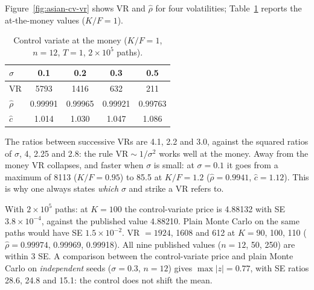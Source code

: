 Figure~\ref{fig:asian-cv-vr} shows VR and $\hat\rho$ for four volatilities; Table~\ref{tab:asian-vr} reports the
at-the-money values ($K/F=1$).
\begin{table}[htbp]
\centering
\small
\caption{Control variate at the money ($K/F=1$, $n=12$, $T=1$, $2\times10^5$ paths).}
\label{tab:asian-vr}
\begin{tabular}{lcccc}
\toprule
$\sigma$ & 0.1 & 0.2 & 0.3 & 0.5\\
\midrule
VR & 5793 & 1416 & 632 & 211\\
$\hat\rho$ & 0.99991 & 0.99965 & 0.99921 & 0.99763\\
$\hat c$ & 1.014 & 1.030 & 1.047 & 1.086\\
\bottomrule
\end{tabular}
\end{table}

The ratios between successive VRs are 4.1, 2.2 and 3.0, against the squared ratios of $\sigma$, 4, 2.25 and 2.8: the
rule $\mathrm{VR}\sim1/\sigma^2$ works well at the money. Away from the money VR collapses, and faster when $\sigma$ is
small: at $\sigma=0.1$ it goes from a maximum of 8113 ($K/F=0.95$) to 85.5 at $K/F=1.2$ ($\hat\rho=0.9941$,
$\hat c=1.12$). This is why one always states \emph{which} $\sigma$ and strike a VR refers to.

\begin{esempio}[title={\texorpdfstring{Example: Fusai--Meucci, arithmetic with $n=12$}{Example: Fusai--Meucci,
arithmetic with n=12}}]
With $2\times10^5$ paths: at $K=100$ the control-variate price is 4.88132 with SE $3.8\times10^{-4}$, against the
published value 4.88210. Plain Monte Carlo on the same paths would have SE $1.5\times10^{-2}$. VR $=1924$, 1608 and 612
at $K=90$, 100, 110 ($\hat\rho=0.99974$, 0.99969, 0.99918). All nine published values ($n=12$, 50, 250) are within
3 SE. A comparison between the control-variate price and plain Monte Carlo on \emph{independent} seeds ($\sigma=0.3$,
$n=12$) gives $\max|z|=0.77$, with SE ratios 28.6, 24.8 and 15.1: the control does not shift the mean.
\end{esempio}

